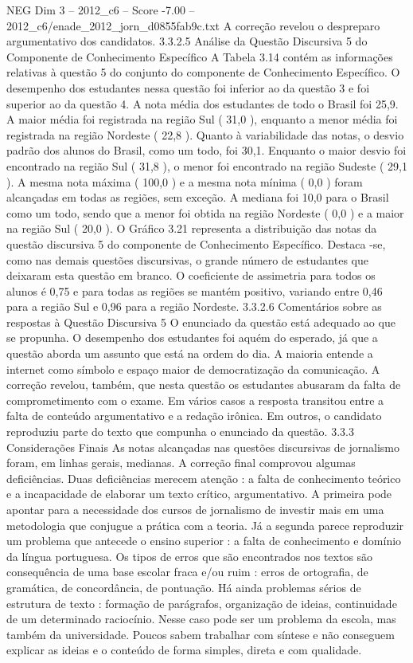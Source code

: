 \begin{textsample}{NEG Dim 3 – 2012\_c6 – Score -7.00 – 2012\_c6/enade\_2012\_jorn\_d0855fab9c.txt}
A correção revelou o despreparo argumentativo dos candidatos. 3.3.2.5 Análise da Questão Discursiva 5 do Componente de Conhecimento Específico A Tabela 3.14 contém as informações relativas à questão 5 do conjunto do componente de Conhecimento Específico.
O desempenho dos estudantes nessa questão foi inferior ao da questão 3 e foi superior ao da questão 4.
A nota média dos estudantes de todo o Brasil foi 25,9.
A maior média foi registrada na região Sul ( 31,0 ), enquanto a menor média foi registrada na região Nordeste ( 22,8 ).
Quanto à variabilidade das notas, o desvio padrão dos alunos do Brasil, como um todo, foi 30,1.
Enquanto o maior desvio foi encontrado na região Sul ( 31,8 ), o menor foi encontrado na região Sudeste ( 29,1 ).
A mesma nota máxima ( 100,0 ) e a mesma nota mínima ( 0,0 ) foram alcançadas em todas as regiões, sem exceção.
A mediana foi 10,0 para o Brasil como um todo, sendo que a menor foi obtida na região Nordeste ( 0,0 ) e a maior na região Sul ( 20,0 ).
O Gráfico 3.21 representa a distribuição das notas da questão discursiva 5 do componente de Conhecimento Específico.
Destaca -se, como nas demais questões discursivas, o grande número de estudantes que deixaram esta questão em branco.
O coeficiente de assimetria para todos os alunos é 0,75 e para todas as regiões se mantém positivo, variando entre 0,46 para a região Sul e 0,96 para a região Nordeste. 3.3.2.6 Comentários sobre as respostas à Questão Discursiva 5 O enunciado da questão está adequado ao que se propunha.
O desempenho dos estudantes foi aquém do esperado, já que a questão aborda um assunto que está na ordem do dia.
A maioria entende a internet como símbolo e espaço maior de democratização da comunicação.
A correção revelou, também, que nesta questão os estudantes abusaram da falta de comprometimento com o exame.
Em vários casos a resposta transitou entre a falta de conteúdo argumentativo e a redação irônica.
Em outros, o candidato reproduziu parte do texto que compunha o enunciado da questão. 3.3.3 Considerações Finais As notas alcançadas nas questões discursivas de jornalismo foram, em linhas gerais, medianas.
A correção final comprovou algumas deficiências.
Duas deficiências merecem atenção : a falta de conhecimento teórico e a incapacidade de elaborar um texto crítico, argumentativo.
A primeira pode apontar para a necessidade dos cursos de jornalismo de investir mais em uma metodologia que conjugue a prática com a teoria.
Já a segunda parece reproduzir um problema que antecede o ensino superior : a falta de conhecimento e domínio da língua portuguesa.
Os tipos de erros que são encontrados nos textos são consequência de uma base escolar fraca e/ou ruim : erros de ortografia, de gramática, de concordância, de pontuação.
Há ainda problemas sérios de estrutura de texto : formação de parágrafos, organização de ideias, continuidade de um determinado raciocínio.
Nesse caso pode ser um problema da escola, mas também da universidade.
Poucos sabem trabalhar com síntese e não conseguem explicar as ideias e o conteúdo de forma simples, direta e com qualidade.

\end{textsample}
